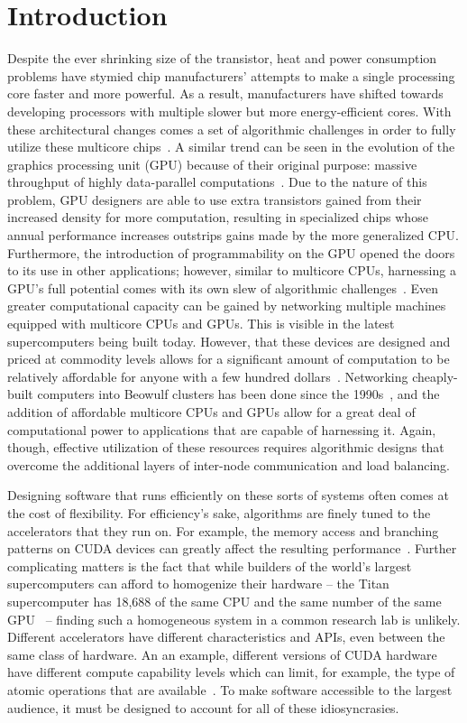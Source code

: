\chapter{Introduction}

Despite the ever shrinking size of the transistor, heat and power
consumption problems have stymied chip manufacturers' attempts to
make a single processing core faster and more powerful. As a result,
manufacturers have shifted towards developing processors with multiple
slower but more energy-efficient cores. With these architectural
changes comes a set of algorithmic challenges in order to fully utilize
these multicore chips~\cite{multicore}.  A similar trend can be seen
in the evolution of the graphics processing unit (GPU) because of
their original purpose: massive throughput of highly data-parallel
computations~\cite{gpu_computing}. Due to the nature of this problem,
GPU designers are able to use extra transistors gained from their
increased density for more computation, resulting in specialized chips
whose annual performance increases outstrips gains made by the more
generalized CPU. Furthermore, the introduction of programmability on
the GPU opened the doors to its use in other applications; however,
similar to multicore CPUs, harnessing a GPU's full potential comes with
its own slew of algorithmic challenges~\cite{gpgpu}.  Even greater
computational capacity can be gained by networking multiple machines
equipped with multicore CPUs and GPUs. This is visible in the latest
supercomputers being built today. However, that these devices are
designed and priced at commodity levels allows for a significant amount
of computation to be relatively affordable for anyone with a few hundred
dollars~\cite{mpi_cuda}.  Networking cheaply-built computers into Beowulf
clusters has been done since the 1990s~\cite{beowulf}, and the addition of
affordable multicore CPUs and GPUs allow for a great deal of computational
power to applications that are capable of harnessing it. Again, though,
effective utilization of these resources requires algorithmic designs
that overcome the additional layers of inter-node communication and
load balancing.

Designing software that runs efficiently on these sorts of systems often
comes at the cost of flexibility. For efficiency's sake, algorithms
are finely tuned to the accelerators that they run on. For example,
the memory access and branching patterns on CUDA devices can greatly
affect the resulting performance~\cite{nvidia_best_practices}.  Further
complicating matters is the fact that while builders of the world's
largest supercomputers can afford to homogenize their hardware -- the
Titan supercomputer has 18,688 of the same CPU and the same number of
the same GPU~\cite{titan_supercomputer} -- finding such a homogeneous
system in a common research lab is unlikely. Different accelerators
have different characteristics and APIs, even between the same class
of hardware.  An an example, different versions of CUDA hardware have
different compute capability levels which can limit, for example, the
type of atomic operations that are available~\cite{nvidia_cuda_guide}.
To make software accessible to the largest audience, it must be designed
to account for all of these idiosyncrasies.

